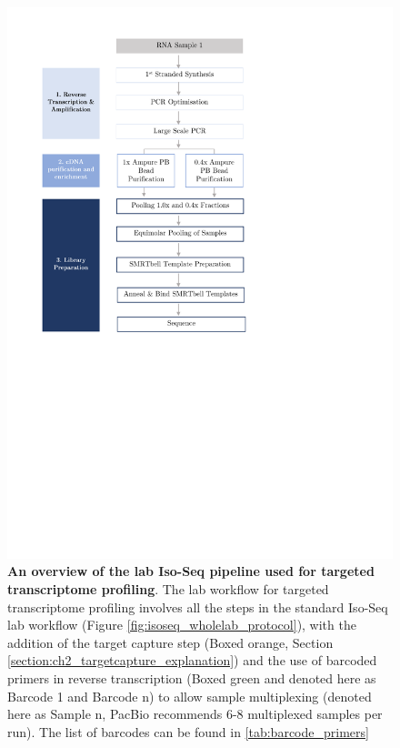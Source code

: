 \begin{figure}[]
	\begin{center}
		\includegraphics[page=2,trim={1cm 12cm 1cm 1cm},clip,scale = 0.8]{Figures/ProjectDevelopment_Figures.pdf}
	\end{center}
	\captionsetup{width=0.95\textwidth}
	\caption[Iso-Seq Lab workflow used for targeted transcriptome sequencing]%
	{\textbf{An overview of the lab Iso-Seq pipeline used for targeted transcriptome profiling}. The lab workflow for targeted transcriptome profiling involves all the steps in the standard Iso-Seq lab workflow (Figure \ref{fig:isoseq_wholelab_protocol}), with the addition of the target capture step (Boxed orange, Section \ref{section:ch2_targetcapture_explanation}) and the use of barcoded primers in reverse transcription (Boxed green and denoted here as Barcode 1 and Barcode n) to allow sample multiplexing (denoted here as Sample n, PacBio recommends 6-8 multiplexed samples per run). The list of barcodes can be found in \cref{tab:barcode_primers}}
	\label{fig:isoseq_targetedlab_protocol}
\end{figure}


